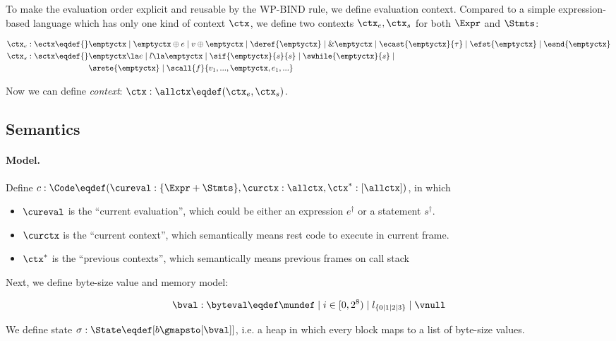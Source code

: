 To make the evaluation order explicit and reusable by the $\text{WP-BIND}$ rule, we define evaluation context.
Compared to a simple expression-based language which has only one kind of context $\ctx$, we define two contexts
$\ctx_e, \ctx_s$ for both $\Expr$ and $\Stmts$:

\begin{align*}
    \ctx_e : \ectx \eqdef{}&
        \emptyctx \mid \emptyctx \oplus e \mid v \oplus \emptyctx \mid
        \deref{\emptyctx} \mid \& \emptyctx \mid \ecast{\emptyctx}{\tau} \mid
        \efst{\emptyctx} \mid \esnd{\emptyctx}
\\
    \ctx_s : \sctx \eqdef{}&
        \emptyctx \la e \mid l \la \emptyctx \mid \sif{\emptyctx}{s}{s} \mid \swhile{\emptyctx}{s} \mid \\&
         \srete{\emptyctx} \mid \scall{f}{v_1, ..., \emptyctx, e_1, ...}
\end{align*}

Now we can define \emph{context}: $\ctx : \allctx \eqdef (\ctx_e, \ctx_s)$.

\subsection{Semantics}
\paragraph{Model.}

Define $c: \Code \eqdef (\cureval: \{ \Expr + \Stmts\}, \curctx: \allctx, \ctx^{*}: [\allctx])$, in which

\begin{itemize}
\item $\cureval$ is the ``current evaluation'', which could be either an expression $e^\dag$ or a statement $s^\dag$.
\item $\curctx$ is the ``current context'', which semantically means rest code to execute in current frame.
\item $\ctx^{*}$ is the ``previous contexts'', which semantically means previous frames on call stack
\end{itemize}

Next, we define byte-size value and memory model:

\[\bval : \byteval \eqdef \mundef \mid i \in [0, 2^8) \mid l_{\{0 \mid 1 \mid 2 \mid 3\}} \mid \vnull\]

We define state $\sigma: \State \eqdef [ b \gmapsto [\bval] ]$,
i.e. a heap in which every block maps to a list of byte-size values.

